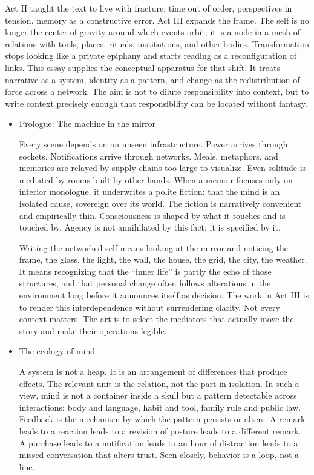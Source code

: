 \documentclass[11pt]{article}
\begin{document}
Act II taught the text to live with fracture: time out of order, perspectives in tension, memory as a constructive error. Act III expands the frame. The self is no longer the center of gravity around which events orbit; it is a node in a mesh of relations with tools, places, rituals, institutions, and other bodies. Transformation stops looking like a private epiphany and starts reading as a reconfiguration of links. This essay supplies the conceptual apparatus for that shift. It treats narrative as a system, identity as a pattern, and change as the redistribution of force across a network. The aim is not to dilute responsibility into context, but to write context precisely enough that responsibility can be located without fantasy.
\begin{itemize}
\item Prologue: The machine in the mirror
\label{sec:org02154cc}

Every scene depends on an unseen infrastructure. Power arrives through sockets. Notifications arrive through networks. Meals, metaphors, and memories are relayed by supply chains too large to visualize. Even solitude is mediated by rooms built by other hands. When a memoir focuses only on interior monologue, it underwrites a polite fiction: that the mind is an isolated cause, sovereign over its world. The fiction is narratively convenient and empirically thin. Consciousness is shaped by what it touches and is touched by. Agency is not annihilated by this fact; it is specified by it.

Writing the networked self means looking at the mirror and noticing the frame, the glass, the light, the wall, the house, the grid, the city, the weather. It means recognizing that the “inner life” is partly the echo of those structures, and that personal change often follows alterations in the environment long before it announces itself as decision. The work in Act III is to render this interdependence without surrendering clarity. Not every context matters. The art is to select the mediators that actually move the story and make their operations legible.
\item The ecology of mind
\label{sec:org5f2ce83}

A system is not a heap. It is an arrangement of differences that produce effects. The relevant unit is the relation, not the part in isolation. In such a view, mind is not a container inside a skull but a pattern detectable across interactions: body and language, habit and tool, family rule and public law. Feedback is the mechanism by which the pattern persists or alters. A remark leads to a reaction leads to a revision of posture leads to a different remark. A purchase leads to a notification leads to an hour of distraction leads to a missed conversation that alters trust. Seen closely, behavior is a loop, not a line.


\end{itemize}
\end{document}
